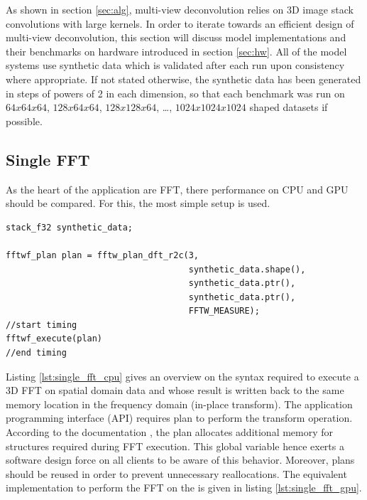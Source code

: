 As shown in section \ref{sec:alg}, multi-view deconvolution relies on 3D image stack convolutions with large kernels. In order to iterate towards an efficient design of multi-view deconvolution, this section will discuss model implementations and their benchmarks on hardware introduced in section \ref{sec:hw}. All of the model systems use synthetic data which is validated after each run upon consistency where appropriate. If not stated otherwise, the synthetic data has been generated in steps of powers of 2 in each dimension, so that each benchmark was run on $64x64x64$, $128x64x64$, $128x128x64$, \dots, $1024x1024x1024$ shaped datasets if possible.

\subsection{Single FFT}

As the heart of the application are FFT, there performance on CPU and GPU should be compared. For this, the most simple setup is used.

\begin{lstlisting}[caption={Single FFT on synthetic data performed on CPU in pseudo-code based on the \fftw{} syntax.},label={lst:single_fft_cpu}]
stack_f32 synthetic_data;

fftwf_plan plan = fftw_plan_dft_r2c(3,
                                    synthetic_data.shape(),
                                    synthetic_data.ptr(),
                                    synthetic_data.ptr(),
                                    FFTW_MEASURE);
//start timing
fftwf_execute(plan)
//end timing
\end{lstlisting}

Listing \ref{lst:single_fft_cpu} gives an overview on the syntax required to execute a \fftw{} 3D FFT on spatial domain data and whose result is written back to the same memory location in the frequency domain (in-place transform). The application programming interface (API) requires plan to perform the transform operation. According to the documentation \cite{fftw_manual}, the plan allocates additional memory for structures required during FFT execution. This global variable hence exerts a software design force on all clients to be aware of this behavior. Moreover, plans should be reused in order to prevent unnecessary reallocations. The equivalent implementation to perform the FFT on the \gpu{} is given in listing \ref{lst:single_fft_gpu}.\newline

